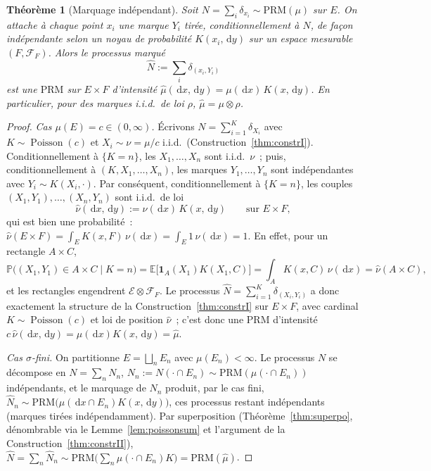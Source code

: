 \documentclass[11pt,a4paper]{article}
\theoremstyle{plain}
\newtheorem{theoreme}{Théorème}[section]
\theoremstyle{definition}
\newcommand{\E}{\mathbb{E}}
\newcommand{\PP}{\mathbb{P}}
\newcommand{\Poi}{\operatorname{Poisson}}
\newcommand{\one}{\mathbf{1}}
\newcommand{\dd}{\,\mathrm{d}}
\newcommand{\calE}{\mathcal{E}}
\newcommand{\calF}{\mathcal{F}}
\begin{document}
\begin{theoreme}[Marquage indépendant]\label{thm:marquage}
Soit $N=\sum_i\delta_{x_i}\sim\mathrm{PRM}(\mu)$ sur $E$. On attache à chaque point $x_i$ une \emph{marque} $Y_i$ tirée, conditionnellement à $N$, de façon indépendante selon un noyau de probabilité $K(x_i,\dd y)$ sur un espace mesurable $(F,\calF_F)$. Alors le processus marqué
\[
\widehat N := \sum_i \delta_{(x_i,Y_i)}
\]
est une $\mathrm{PRM}$ sur $E\times F$ d'intensité $\hat\mu(\dd x,\dd y)=\mu(\dd x)\,K(x,\dd y)$. En particulier, pour des marques i.i.d.\ de loi $\rho$, $\hat\mu=\mu\otimes\rho$.
\end{theoreme}

\begin{proof}
\emph{Cas $\mu(E)=c\in(0,\infty)$.} Écrivons $N=\sum_{i=1}^K\delta_{X_i}$ avec $K\sim\Poi(c)$ et $X_i\sim\nu=\mu/c$ i.i.d.\ (Construction~\ref{thm:constrI}). Conditionnellement à $\{K=n\}$, les $X_1,\dots,X_n$ sont i.i.d.\ $\nu$~; puis, conditionnellement à $(K,X_1,\dots,X_n)$, les marques $Y_1,\dots,Y_n$ sont indépendantes avec $Y_i\sim K(X_i,\cdot)$. Par conséquent, conditionnellement à $\{K=n\}$, les couples $(X_1,Y_1),\dots,(X_n,Y_n)$ sont i.i.d.\ de loi
\[
\hat\nu(\dd x,\dd y):=\nu(\dd x)\,K(x,\dd y)\qquad\text{sur } E\times F,
\]
qui est bien une probabilité~: $\hat\nu(E\times F)=\int_E K(x,F)\,\nu(\dd x)=\int_E 1\,\nu(\dd x)=1$. En effet, pour un rectangle $A\times C$,
\[
\PP\big((X_1,Y_1)\in A\times C\mid K=n\big)=\E\big[\one_A(X_1)K(X_1,C)\big]=\int_A K(x,C)\,\nu(\dd x)=\hat\nu(A\times C),
\]
et les rectangles engendrent $\calE\otimes\calF_F$. Le processus $\widehat N=\sum_{i=1}^K\delta_{(X_i,Y_i)}$ a donc exactement la structure de la Construction~\ref{thm:constrI} sur $E\times F$, avec cardinal $K\sim\Poi(c)$ et loi de position $\hat\nu$~; c'est donc une $\mathrm{PRM}$ d'intensité $c\,\hat\nu(\dd x,\dd y)=\mu(\dd x)K(x,\dd y)=\hat\mu$.

\emph{Cas $\sigma$-fini.} On partitionne $E=\bigsqcup_n E_n$ avec $\mu(E_n)<\infty$. Le processus $N$ se décompose en $N=\sum_n N_n$, $N_n:=N(\cdot\cap E_n)\sim\mathrm{PRM}(\mu(\cdot\cap E_n))$ indépendants, et le marquage de $N_n$ produit, par le cas fini, $\widehat N_n\sim\mathrm{PRM}\big(\mu(\dd x\cap E_n)K(x,\dd y)\big)$, ces processus restant indépendants (marques tirées indépendamment). Par superposition (Théorème~\ref{thm:superpo}, dénombrable via le Lemme~\ref{lem:poissonsum} et l'argument de la Construction~\ref{thm:constrII}), $\widehat N=\sum_n\widehat N_n\sim\mathrm{PRM}\big(\sum_n \mu(\cdot\cap E_n)K\big)=\mathrm{PRM}(\hat\mu)$.
\end{proof}
\end{document}
